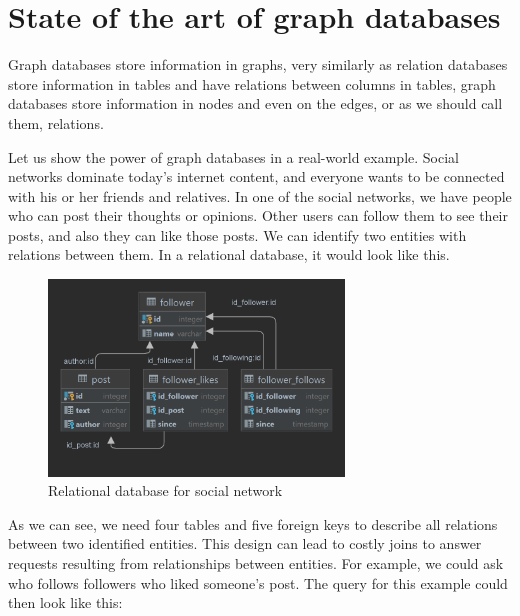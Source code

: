 \chapter {State of the art of graph databases}

Graph databases store information in graphs, very similarly as relation databases store information in tables and have relations between columns in tables,
graph databases store information in nodes and even on the edges, or as we should call them, relations. \cite{morgante_what_2021}

Let us show the power of graph databases in a real-world example. Social networks dominate today's internet content, and everyone wants to be connected with his or her friends and relatives. In one of the social networks, we have people who can post their thoughts or opinions.
Other users can follow them to see their posts, and also they can like those posts. We can identify two entities with relations between them. In a relational database, it would look like this.

\begin{figure}[H]
    \centering
    \includegraphics[width=0.7\textwidth]{content/relational-dbms-social-network.png}
    \caption{Relational database for social network}
\end{figure}

As we can see, we need four tables and five foreign keys to describe all relations between two identified entities.
This design can lead to costly joins to answer requests resulting from relationships between entities. For example, we could ask who follows followers who liked someone's post. The query for this example could then look like this:


